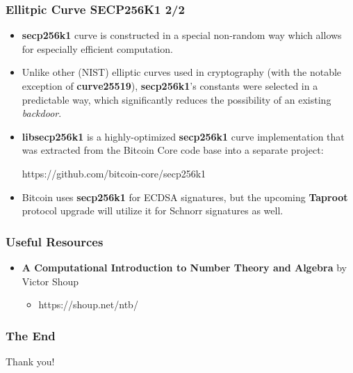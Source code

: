\documentclass{beamer}
\begin{document}
\begin{frame}
  \frametitle{Ellitpic Curve SECP256K1 2/2}
  \begin{itemize}
  \item \textbf{secp256k1} curve is constructed in a special non-random way
    which allows for especially efficient computation.
  \item Unlike other (NIST) elliptic curves used in cryptography (with the
    notable exception of \textbf{curve25519}), \textbf{secp256k1}'s constants
    were selected in a predictable way, which significantly reduces the
    possibility of an existing \textit{backdoor}.
  \item \textbf{libsecp256k1} is a highly-optimized \textbf{secp256k1} curve
    implementation that was extracted from the Bitcoin Core code base into a
    separate project:
    \begin{center}
      https://github.com/bitcoin-core/secp256k1
    \end{center}
  \item Bitcoin uses \textbf{secp256k1} for ECDSA signatures, but the upcoming
    \textbf{Taproot} protocol upgrade will utilize it for Schnorr signatures as
    well.
  \end{itemize}    
\end{frame}

\begin{frame}
  \frametitle{Useful Resources}
  \begin{itemize}
  \item \textbf{A Computational Introduction to Number Theory and Algebra} by
    Victor Shoup
    \begin{itemize}
    \item https://shoup.net/ntb/
    \end{itemize}
  \end{itemize}
\end{frame}

\begin{frame}
  \frametitle{The End}
  \begin{center}
    Thank you!
  \end{center}
\end{frame}
\end{document}
